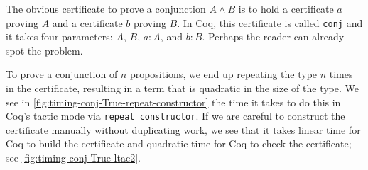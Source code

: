The obvious certificate to prove a conjunction $A \wedge B$ is to hold a certificate $a$ proving $A$ and a certificate $b$ proving $B$.
In Coq, this certificate is called \texttt{conj} and it takes four parameters: $A$, $B$, $a : A$, and $b : B$.
Perhaps the reader can already spot the problem.

To prove a conjunction of $n$ propositions, we end up repeating the type $n$ times in the certificate, resulting in a term that is quadratic in the size of the type.
We see in \autoref{fig:timing-conj-True-repeat-constructor} the time it takes to do this in Coq's tactic mode via \texttt{repeat constructor}.
If we are careful to construct the certificate manually without duplicating work, we see that it takes linear time for Coq to build the certificate and quadratic time for Coq to check the certificate; see \autoref{fig:timing-conj-True-ltac2}.
%
%

